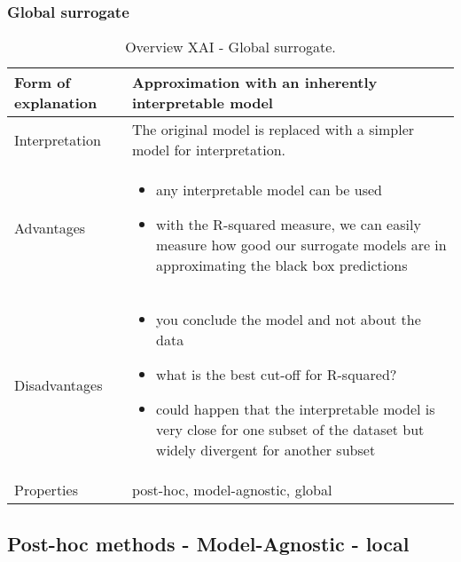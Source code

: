 \subsubsection{Global surrogate}
\begin{table}[H]
  \centering
  \begin{tabular}{|p{}|p{}|}
    \hline
    Form of \newline explanation & 
    Approximation with an inherently interpretable model \\
    
    \hline
    Interpretation & 
    The original model is replaced with a simpler model for interpretation.\\
    \hline
    Advantages &
    \begin{itemize}[nosep, left=0em]
        \item any interpretable model can be used
        \item with the R-squared measure, we can easily measure how good our surrogate models are in approximating the black box predictions
    \end{itemize} \\
    
    \hline
    Disadvantages &
    \begin{itemize}[nosep, left=0em]
        \item you conclude the model and not about the data
        \item what is the best cut-off for R-squared?
        \item could happen that the interpretable model is very close for one subset of the dataset but widely divergent for another subset
    \end{itemize} \\
    
    \hline
    Properties & 
    post-hoc, model-agnostic, global  \\
    
    \hline
  \end{tabular}
  \caption{Overview XAI - Global surrogate.}
  \label{tab:XAIGlobSur}
\end{table}

\subsection{Post-hoc methods - Model-Agnostic - local}

